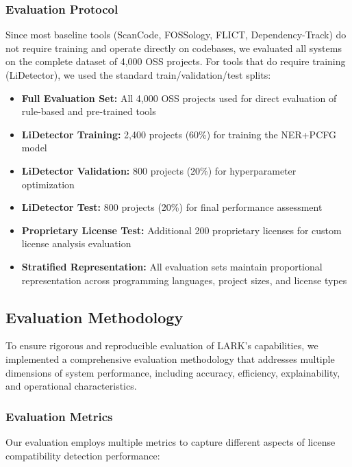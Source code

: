 \subsubsection{Evaluation Protocol}
Since most baseline tools (ScanCode, FOSSology, FLICT, Dependency-Track) do not require training and operate directly on codebases, we evaluated all systems on the complete dataset of 4,000 OSS projects. For tools that do require training (LiDetector), we used the standard train/validation/test splits:

\begin{itemize}
    \item \textbf{Full Evaluation Set:} All 4,000 OSS projects used for direct evaluation of rule-based and pre-trained tools
    \item \textbf{LiDetector Training:} 2,400 projects (60\%) for training the NER+PCFG model
    \item \textbf{LiDetector Validation:} 800 projects (20\%) for hyperparameter optimization
    \item \textbf{LiDetector Test:} 800 projects (20\%) for final performance assessment
    \item \textbf{Proprietary License Test:} Additional 200 proprietary licenses for custom license analysis evaluation
    \item \textbf{Stratified Representation:} All evaluation sets maintain proportional representation across programming languages, project sizes, and license types
\end{itemize}

\subsection{Evaluation Methodology}
\label{sec:evaluation_methodology}

To ensure rigorous and reproducible evaluation of LARK's capabilities, we implemented a comprehensive evaluation methodology that addresses multiple dimensions of system performance, including accuracy, efficiency, explainability, and operational characteristics.

\subsubsection{Evaluation Metrics}
Our evaluation employs multiple metrics to capture different aspects of license compatibility detection performance:


